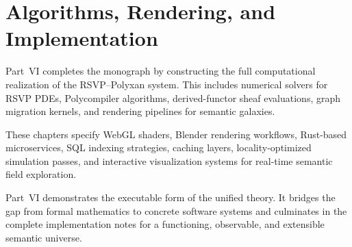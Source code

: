 \part{Algorithms, Rendering, and Implementation}

Part~VI completes the monograph by constructing the full computational
realization of the RSVP--Polyxan system. This includes numerical solvers
for RSVP PDEs, Polycompiler algorithms, derived-functor sheaf
evaluations, graph migration kernels, and rendering pipelines for
semantic galaxies.

These chapters specify WebGL shaders, Blender rendering workflows,
Rust-based microservices, SQL indexing strategies, caching layers,
locality-optimized simulation passes, and interactive visualization
systems for real-time semantic field exploration.

Part~VI demonstrates the executable form of the unified theory. It
bridges the gap from formal mathematics to concrete software systems
and culminates in the complete implementation notes for a functioning,
observable, and extensible semantic universe.

\cleardoublepage
